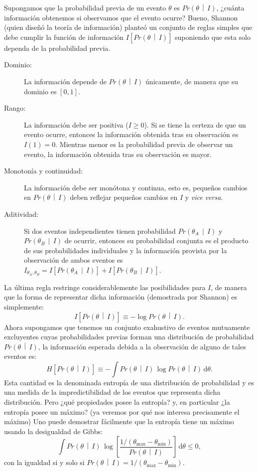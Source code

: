 \documentclass[a4paper,twoside]{article}
\newcommand{\pro}[2]{\ensuremath{Pr\left(#1\,\middle|\, #2\right)}\xspace}
\begin{document}
Supongamos que la probabilidad previa de un evento $\theta$ es $\pro{\theta}{I}$, ¿cuánta
información obtenemos si observamos que el evento ocurre? Bueno, Shannon (quien diseñó la teoría de
información) planteó un conjunto de reglas simples que debe cumplir la función de información
$I[\pro{\theta}{I}]$ suponiendo que esta solo dependa de la probabilidad previa.
%
\begin{description}
%
\item[Dominio:] La información depende de $\pro{\theta}{I}$ únicamente, de manera que su dominio es
$[0,1]$.
\item[Rango:] La información debe ser positiva ($I\geq0$). Si se tiene la certeza de que un evento
ocurre, entonces la información obtenida tras su observación es $I(1)=0$. Mientras menor es la
probabilidad previa de observar un evento, la información obtenida tras su observación es mayor.
\item[Monotonía y continuidad:] La información debe ser monótona y continua, esto es, pequeños
cambios en $\pro{\theta}{I}$ deben reflejar pequeños cambios en $I$ y \emph{vice versa}.
\item[Aditividad:] Si dos eventos independientes tienen probabilidad $\pro{\theta_A}{I}$ y
$\pro{\theta_B}{I}$ de ocurrir, entonces su probabilidad conjunta es el producto de sus
probabilidades individuales y la información provista por la observación de ambos eventos es
$I_{\theta_A,\theta_B} = I[\pro{\theta_A}{I}] + I[\pro{\theta_B}{I}]$.
\end{description}

La última regla restringe considerablemente las posibilidades para $I$, de manera que la forma de
representar dicha información (demostrada por Shannon) es simplemente:
%
$$I[\pro{\theta}{I}] \equiv -\log{\pro{\theta}{I}}.$$
%
Ahora supongamos que tenemos un conjunto exahustivo de eventos mutuamente excluyentes cuyas
probabilidades previas forman una distribución de probabilidad $\pro{\theta}{I}$, la información
esperada debida a la observación de alguno de tales eventos es:
%
$$H[\pro{\theta}{I}] \equiv -\int \pro{\theta}{I}\,\log{\pro{\theta}{I}}\,\text{d}\theta.$$
Esta cantidad es la denominada entropía de una distribución de probabilidad y es una medida de la
impredictibilidad de los eventos que representa dicha distribución. Pero ¿qué propiedades posee la
entropía? y, en particular ¿la entropía posee un máximo? (ya veremos por qué nos interesa
precisamente el máximo) Uno puede demostrar fácilmente que la entropía tiene un máximo usando la
desigualdad de Gibbs:
%
$$\int \pro{\theta}{I}\,\log{\left[\frac{1/(\theta_\text{max}-\theta_\text{min})}{\pro{\theta}{I}}\right]}\,\text{d}\theta\leq0,$$
con la igualdad si y solo si $\pro{\theta}{I}=1/(\theta_\text{max}-\theta_\text{min})$.
\end{document}
